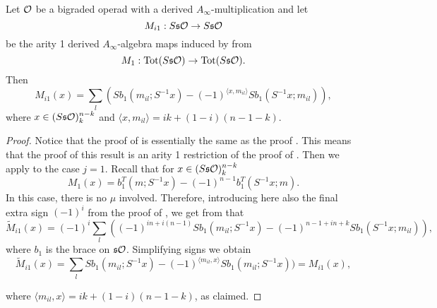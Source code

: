 \documentclass[twoside]{article}
\begin{document}
\begin{corollary}\label{mi1}
Let ${\mathcal O}$ be a bigraded operad with a derived $A_\infty$-multiplication and let \[M_{i1}:S\mathfrak{s}{\mathcal O}\to S\mathfrak{s}{\mathcal O}\] be the arity 1 derived $A_\infty$-algebra maps induced by  from \[M_1:\mathrm{Tot}(S\mathfrak{s}{\mathcal O})\to \mathrm{Tot}(S\mathfrak{s}{\mathcal O}).\]
Then \[M_{i1}(x)= \sum_l (Sb_1(m_{il};S^{-1}x)-(-1)^{\langle x,m_{il}\rangle}Sb_1(S^{-1}x;m_{il})),\]
where $x\in (S\mathfrak{s}{\mathcal O})^{n-k}_k$ and $\langle x,m_{il}\rangle=ik+(1-i)(n-1-k)$.
\end{corollary}
\begin{proof}
Notice that the proof of  is essentially the same as the proof . This means that the proof of this result is an arity 1 restriction of the proof of . Then we apply  to the case $j=1$. Recall that for $x\in (S\mathfrak{s}{\mathcal O})^{n-k}_{k}$
\[M_1(x)=b_1^T(m;S^{-1}x)-(-1)^{n-1}b_1^T(S^{-1}x;m).\]
 In this case, there is no $\mu$ involved. Therefore, introducing here also the final extra sign $(-1)^i$ from the proof of , we get from  that
\[\widetilde{M}_{i1}(x)=(-1)^i\sum_l((-1)^{in+i(n-1)} Sb_1(m_{il};S^{-1}x)-(-1)^{n-1+in+k}Sb_1(S^{-1}x;m_{il})),\] where $b_1$ is the brace on $\mathfrak{s}{\mathcal O}$. Simplifying signs we obtain
\[\widetilde{M}_{i1}(x)=\sum_l Sb_1(m_{il};S^{-1}x)-(-1)^{\langle  m_{il},x\rangle}Sb_1(m_{il};S^{-1}x))=M_{i1}(x),\]

where $\langle  m_{il},x\rangle=ik+(1-i)(n-1-k)$, as claimed.
\end{proof}
\end{document}
